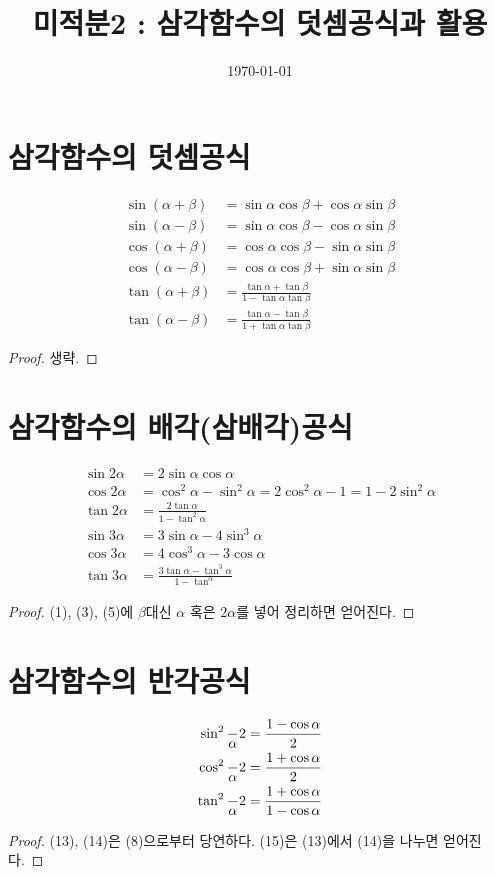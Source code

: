 \documentclass{article}
\renewcommand\a{\ensuremath{\alpha}}
\renewcommand\b{\ensuremath{\beta}}
\begin{document}
\title{미적분2 : 삼각함수의 덧셈공식과 활용}
\author{}
\date{\today}
\maketitle

\section{삼각함수의 덧셈공식}
\begin{align}
\sin(\a+\b)&=\sin\a\cos\b+\cos\a\sin\b\\
\sin(\a-\b)&=\sin\a\cos\b-\cos\a\sin\b\\
\cos(\a+\b)&=\cos\a\cos\b-\sin\a\sin\b\\
\cos(\a-\b)&=\cos\a\cos\b+\sin\a\sin\b\\
\tan(\a+\b)&=\frac{\tan\a+\tan\b}{1-\tan\a\tan\b}\\
\tan(\a-\b)&=\frac{\tan\a-\tan\b}{1+\tan\a\tan\b}
\end{align}
\begin{proof}
생략.
\end{proof}

\section{삼각함수의 배각(삼배각)공식}
\begin{align}
\sin2\a&=2\sin\a\cos\a\\
\cos2\a&=\cos^2\a-\sin^2\a=2\cos^2\a-1=1-2\sin^2\a\\
\tan2\a&=\frac{2\tan\a}{1-\tan^2\a}\\
\sin3\a&=3\sin\a-4\sin^3\a\\
\cos3\a&=4\cos^3\a-3\cos\a\\
\tan3\a&=\frac{3\tan\a-\tan^3\a}{1-\tan^\a}
\end{align}
\begin{proof}
(1), (3), (5)에 \b 대신 \(\a\) 혹은 \(2\a\)를 넣어 정리하면 얻어진다.
\end{proof}

\section{삼각함수의 반각공식}
\begin{align}
\sin^2\frac\a2&=\frac{1-\cos\a}2\\
\cos^2\frac\a2&=\frac{1+\cos\a}2\\
\tan^2\frac\a2&=\frac{1+\cos\a}{1-\cos\a}
\end{align}
\begin{proof}
(13), (14)은 (8)으로부터 당연하다.
(15)은 (13)에서 (14)을 나누면 얻어진다.
\end{proof}
\end{document}
